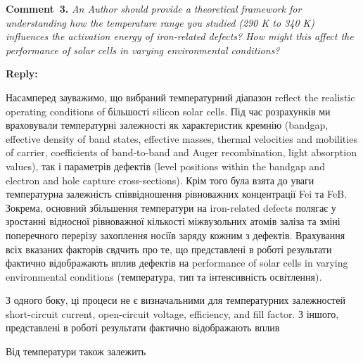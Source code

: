 \documentclass[a4paper,fleqn]{cas-sc}
\begin{document}


\vspace{1cm}
\noindent
\textcolor[rgb]{0.00,0.50,1.00}{\textbf{Comment~3.}}
\emph{An Author should provide a theoretical framework for understanding how the temperature range you studied (290 K to 340 K) influences the activation energy of iron-related defects? How might this affect the performance of solar cells in varying environmental conditions?}



%

\noindent
\textcolor[rgb]{0.51,0.00,0.00}{\textbf{Reply:}}

Насамперед зауважимо, що вибраний температурний діапазон  reflect the realistic operating conditions of більшості silicon solar cells.
Під час розрахунків ми враховували температурні залежності як характеристик кремнію (bandgap, effective density of band states, effective masses, thermal velocities and mobilities of carrier, coefficients of band-to-band and Auger recombination, light absorption values), так і параметрів дефектів (level positions within the
bandgap and electron and hole capture cross-sections).
Крім того була взята до уваги температурна залежність співвідношення рівноважних концентрації Fei та FeB.
Зокрема, основний збільшення температури на iron-related defects полягає у зростанні відносної рівноважної кількості міжвузольних атомів заліза та зміні поперечного перерізу захоплення носіїв заряду кожним з дефектів.
Врахування всіх вказаних факторів свдчить про те, що представлені в роботі результати фактично відображають вплив дефектів на performance of solar cells in varying environmental conditions (температура, тип та інтенсивність освітлення).

З одного боку, ці процеси не є визначальними для температурних залежностей short-circuit current,
open-circuit voltage, efficiency, and fill factor.
З іншого, представлені в роботі результати фактично відображають вплив

 

Від температури також залежить 
\end{document}
